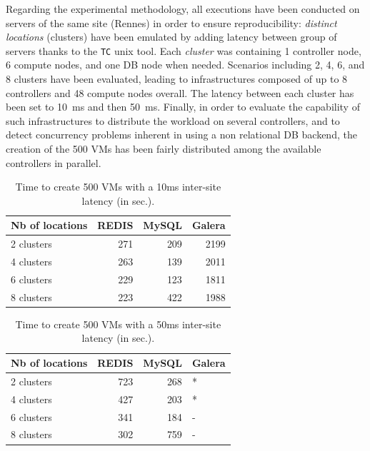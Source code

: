 
Regarding the experimental methodology, all executions have been conducted on
servers of the same site (Rennes) in order to ensure reproducibility:
\emph{distinct locations} (\ie clusters) have been emulated by adding latency
between group of servers thanks to the \texttt{TC} unix tool. Each
\emph{cluster} was containing 1 controller node, 6 compute nodes, and one DB
node when needed. Scenarios including 2, 4, 6, and 8 clusters have been
evaluated, leading to infrastructures composed of up to 8 controllers and 48
compute nodes overall. The latency between each cluster has been set to 10~ms
and then 50~ms. Finally, in order to evaluate the capability of such
infrastructures to distribute the workload on several controllers, and to detect
concurrency problems inherent in using a non relational DB backend, the creation
of the 500 VMs has been fairly distributed among the available controllers in
parallel.

\begin{table}[htb]
\caption{\label{tab:orgtable1}
Time to create 500 VMs with a 10ms inter-site latency (in sec.).}
\centering
\begin{tabular}{lrrr}
Nb of locations & REDIS & MySQL & Galera\\
\hline
2 clusters & 271 & 209 & 2199\\
4 clusters & 263 & 139 & 2011\\
6 clusters & 229 & 123 & 1811\\
8 clusters & 223 & 422 & 1988\\
\end{tabular}
\end{table}

\begin{table}[htb]
\caption{\label{tab:orgtable2}
Time to create 500 VMs with a 50ms inter-site latency (in sec.).}
\centering
\begin{tabular}{lrrl}
Nb of locations & REDIS & MySQL & Galera\\
\hline
2 clusters & 723 & 268 & *\\
4 clusters & 427 & 203 & *\\
6 clusters & 341 & 184 & -\\
8 clusters & 302 & 759 & -\\
\end{tabular}
\end{table}

